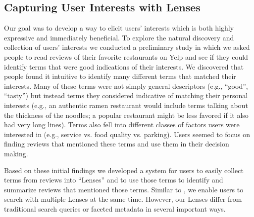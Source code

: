 \documentclass{sigchi}
\begin{document}
\subsection{Capturing User Interests with Lenses}

Our goal was to develop a way to elicit users' interests which is both highly expressive and immediately beneficial. To explore the natural discovery and collection of users' interests we conducted a preliminary study in which we asked people to read reviews of their favorite restaurants on Yelp and see if they could identify terms that were good indications of their interests. We discovered that people found it intuitive to identify many different terms that matched their interests. Many of these terms were not simply general descriptors (e.g., ``good'', ``tasty'') but instead terms they considered indicative of matching their personal interests (e.g., an authentic ramen restaurant would include terms talking about the thickness of the noodles; a popular restaurant might be less favored if it also had very long lines). Terms also fell into different classes of factors users were interested in (e.g., service vs. food quality vs. parking). Users seemed to focus on finding reviews that mentioned these terms and use them in their decision making.

Based on these initial findings we developed a system for users to easily collect terms from reviews into ``Lenses'' and to use those terms to identify and summarize reviews that mentioned those terms. Similar to \cite{hearst1996visualizing}, we enable users to search with multiple Lenses at the same time. However, our Lenses differ from traditional search queries or faceted metadata in several important ways. 
\end{document}
